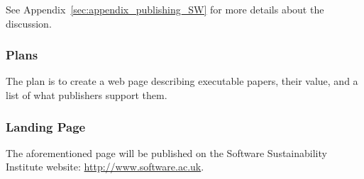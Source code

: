 See Appendix~\ref{sec:appendix_publishing_SW} for more details about the
discussion.

\subsubsection{Plans}

The plan is to create a web page describing executable papers, their value, and
a list of what publishers support them.

\subsubsection{Landing Page}

The aforementioned page will be published on the Software Sustainability Institute website: \url{http://www.software.ac.uk}.
